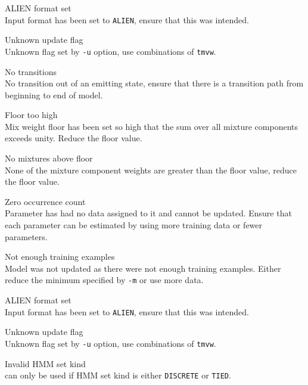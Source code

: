 \begin{itemize}
\begin{itemize}
    ALIEN format set\\
        Input format has been set to \texttt{ALIEN}, ensure that this was 
        intended.

\end{itemize}


\begin{itemize}
    Unknown update flag\\
        Unknown flag set by \texttt{-u} option, use combinations of 
        \texttt{tmvw}.

    No transitions\\
        No transition out of an emitting state, ensure that
        there is a transition path from beginning to end of model.

    Floor too high\\
        Mix weight floor has been set so high that the sum over all 
        mixture components exceeds unity.  Reduce the floor value.

    No mixtures above floor\\
        None of the mixture component weights are greater than the floor value,
        reduce the floor value.

    Zero occurrence count\\
        Parameter has had no data assigned to it and cannot be
        updated.  Ensure that each parameter can be estimated by
        using more training data or fewer parameters.

    Not enough training examples\\
        Model was not updated as there were not enough training examples.
        Either reduce the minimum specified by \texttt{-m} or
        use more data.

    ALIEN format set\\
        Input format has been set to \texttt{ALIEN}, ensure that this was 
        intended.

\end{itemize}


\begin{itemize}
    Unknown update flag\\
        Unknown flag set by \texttt{-u} option, use combinations of 
        \texttt{tmvw}.

    Invalid HMM set kind\\
         can only be used if HMM set kind is either
        \texttt{DISCRETE} or \texttt{TIED}.


\end{itemize}
\end{itemize}
